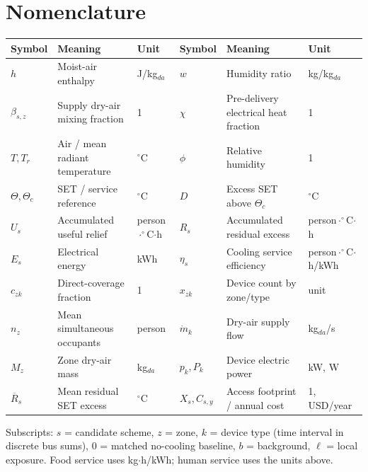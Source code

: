 \section{Nomenclature}
\label{sec:nomenclature}
\begin{table}[H]
\centering\fontsize{9.5}{11}\selectfont
\begin{tabularx}{\linewidth}{@{}lXl@{\hspace{9pt}}lXl@{}}
\toprule
Symbol & Meaning & Unit & Symbol & Meaning & Unit\\
\midrule
$h$ & Moist-air enthalpy & J/kg$_{da}$ & $w$ & Humidity ratio & kg/kg$_{da}$\\
$\beta_{s,z}$ & Supply dry-air mixing fraction & 1 & $\chi$ & Pre-delivery electrical heat fraction & 1\\
$T,T_r$ & Air / mean radiant temperature & $^\circ$C & $\phi$ & Relative humidity & 1\\
$\Theta,\Theta_c$ & SET / service reference & $^\circ$C & $D$ & Excess SET above $\Theta_c$ & $^\circ$C\\
$U_s$ & Accumulated useful relief & person$\cdot^\circ$C$\cdot$h & $R_s$ & Accumulated residual excess & person$\cdot^\circ$C$\cdot$h\\
$E_s$ & Electrical energy & kWh & $\eta_s$ & Cooling service efficiency & person$\cdot^\circ$C$\cdot$h/kWh\\
$c_{zk}$ & Direct-coverage fraction & 1 & $x_{zk}$ & Device count by zone/type & unit\\
$n_z$ & Mean simultaneous occupants & person & $\dot m_k$ & Dry-air supply flow & kg$_{da}$/s\\
$M_z$ & Zone dry-air mass & kg$_{da}$ & $p_k,P_k$ & Device electric power & kW, W\\
$\overline R_s$ & Mean residual SET excess & $^\circ$C & $X_s,C_{s,y}$ & Access footprint / annual cost & 1, USD/year\\
\bottomrule
\end{tabularx}
\end{table}
\noindent\small Subscripts: $s$ = candidate scheme, $z$ = zone, $k$ = device type (time interval in discrete bus sums), $0$ = matched no-cooling baseline, $b$ = background, $\ell$ = local exposure. Food service uses kg$\cdot$h/kWh; human service uses the units above.\normalsize
